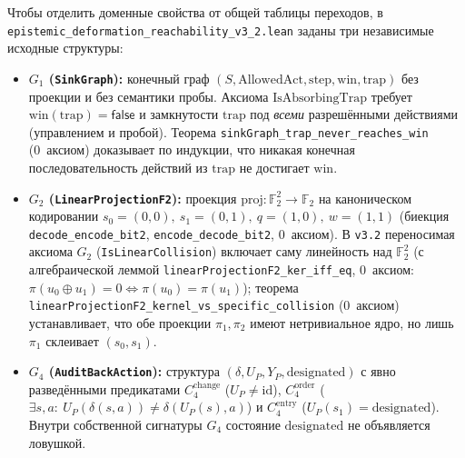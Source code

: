 \documentclass[10pt,a4paper]{article}
\theoremstyle{cleanthm}
\theoremstyle{cleandef}
\begin{document}
Чтобы отделить доменные свойства от общей таблицы переходов, в \texttt{epistemic\_\allowbreak deformation\_\allowbreak reachability\_\allowbreak v3\_\allowbreak 2.lean} заданы три независимые исходные структуры:
\begin{itemize}
  \item \textbf{$G_1$ (\texttt{SinkGraph}):} конечный граф $(S,\mathrm{AllowedAct},\mathrm{step},\mathrm{win},\mathrm{trap})$ без проекции и без семантики пробы. Аксиома $\mathrm{IsAbsorbingTrap}$ требует $\mathrm{win}(\mathrm{trap})=\mathsf{false}$ и замкнутости $\mathrm{trap}$ под \emph{всеми} разрешёнными действиями (управлением и пробой). Теорема \texttt{sinkGraph\_\allowbreak trap\_\allowbreak never\_\allowbreak reaches\_\allowbreak win} (0~аксиом) доказывает по индукции, что никакая конечная последовательность действий из $\mathrm{trap}$ не достигает $\mathrm{win}$.
  \item \textbf{$G_2$ (\texttt{LinearProjectionF2}):} проекция $\mathrm{proj}:\mathbb{F}_2^2\to\mathbb{F}_2$ на каноническом кодировании $s_0=(0,0),\ s_1=(0,1),\ q=(1,0),\ w=(1,1)$ (биекция \texttt{decode\_\allowbreak encode\_\allowbreak bit2}, \texttt{encode\_\allowbreak decode\_\allowbreak bit2}, 0~аксиом). В \texttt{v3.2} переносимая аксиома $G_2$ (\texttt{IsLinearCollision}) включает саму линейность над $\mathbb{F}_2^2$ (с алгебраической леммой \texttt{linearProjectionF2\_\allowbreak ker\_\allowbreak iff\_\allowbreak eq}, 0~аксиом: $\pi(u_0\oplus u_1)=0\iff\pi(u_0)=\pi(u_1)$); теорема \texttt{linearProjectionF2\_\allowbreak kernel\_\allowbreak vs\_\allowbreak specific\_\allowbreak collision} (0~аксиом) устанавливает, что обе проекции $\pi_1,\pi_2$ имеют нетривиальное ядро, но лишь $\pi_1$ склеивает $(s_0,s_1)$.
  \item \textbf{$G_4$ (\texttt{AuditBackAction}):} структура $(\delta, U_P, Y_P, \mathrm{designated})$ с явно разведёнными предикатами $C_4^{\mathrm{change}}$ ($U_P\ne\mathrm{id}$), $C_4^{\mathrm{order}}$ ($\exists s,a:\ U_P(\delta(s,a))\ne\delta(U_P(s),a)$) и $C_4^{\mathrm{entry}}$ ($U_P(s_1)=\mathrm{designated}$). Внутри собственной сигнатуры $G_4$ состояние $\mathrm{designated}$ не объявляется ловушкой.
\end{itemize}
\end{document}
